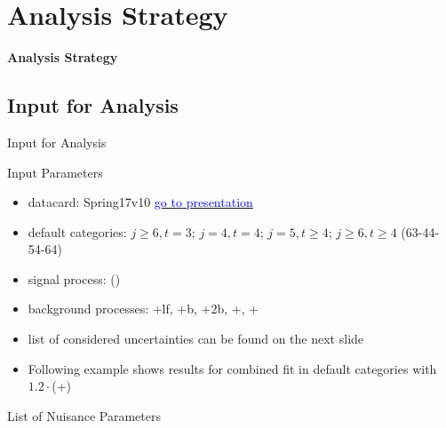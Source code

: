 \section{Analysis Strategy}
\begin{frame}
\centering
\begin{huge}
\textbf{Analysis Strategy}
\end{huge}

\end{frame}


\subsection{Input for Analysis}

\begin{frame}{Input for Analysis}

\begin{block}{Input Parameters}
\begin{itemize}
\item datacard: Spring17v10 \href{https://indico.cern.ch/event/628833/contributions/2624507/attachments/1474840/2283855/KITv10p2.pdf}{\textcolor{blue}{go to presentation}}
\item default categories: $j\geq 6, t=3$; $j=4, t=4$; $j=5, t\geq 4$; $j\geq 6, t\geq 4$ (63-44-54-64)
\item signal process: \ttbarH(\bbbar)
\item background processes: \ttbar+lf, \ttbar+b, \ttbar+2b, \ttbar+\bbbar, \ttbar + \ccbar
\item list of considered uncertainties can be found on the next slide
\end{itemize}
\end{block}
\begin{itemize}
\item Following example shows results for combined fit in default categories with $\num[round-precision=1]{1.2}\cdot$(\ttbar+\bbbar)
\end{itemize}

\end{frame}

\begin{frame}{List of Nuisance Parameters}


\end{frame}

